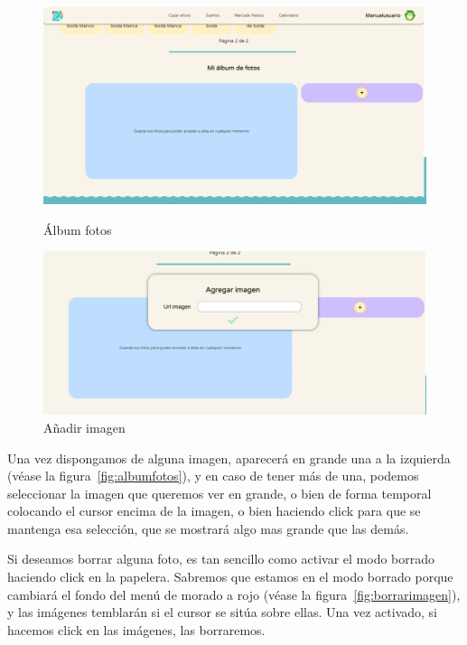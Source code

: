\begin{figure}[!htb]
	\begin{minipage}{0.48\textwidth}
		\centering
		\includegraphics[width=.8\linewidth]{img/cap9/50-album-fotos.png}
		\caption{Álbum fotos}
		\label{fig:album}
	\end{minipage}\hfill
	\begin{minipage}{0.48\textwidth}
		\centering
		\includegraphics[width=.8\linewidth]{img/cap9/51-anadir-imagen.png}
		\caption{Añadir imagen}
		\label{fig:aniadirimagen}
	\end{minipage}
\end{figure}

Una vez dispongamos de alguna imagen, aparecerá en grande una a la izquierda {(v\'ease la figura~\ref{fig:albumfotos})}, y en caso de tener más de una, podemos seleccionar la imagen que queremos ver en grande, o bien de forma temporal colocando el cursor encima de la imagen, o bien haciendo click para que se mantenga esa selección, que se mostrará algo mas grande que las demás.\\


Si deseamos borrar alguna foto, es tan sencillo como activar el modo borrado haciendo click en la papelera. Sabremos que estamos en el modo borrado porque cambiará el fondo del menú de morado a rojo {(v\'ease la figura~\ref{fig:borrarimagen})}, y las imágenes temblarán si el cursor se sitúa sobre ellas. Una vez activado, si hacemos click en las imágenes, las borraremos.\\

